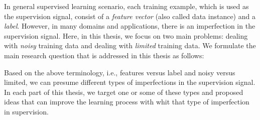 In general supervised learning scenario, each training example, which is used as the supervision signal, consist of a \emph{feature vector} (also called data instance) and a \emph{label}. However, in many domains and applications, there is an imperfection in the supervision signal. Here, in this thesis, we focus on two main problems: dealing with \emph{noisy} training data and dealing with \emph{limited} training data. 
We formulate the main research question that is addressed in this thesis as follows:

Based on the above terminology, i.e., features versus label and noisy versus limited, we can presume different types of imperfections in the supervision signal. In each part of this thesis, we target one or some of these types and proposed ideas that can improve the learning process with whit that type of imperfection in supervision. 

